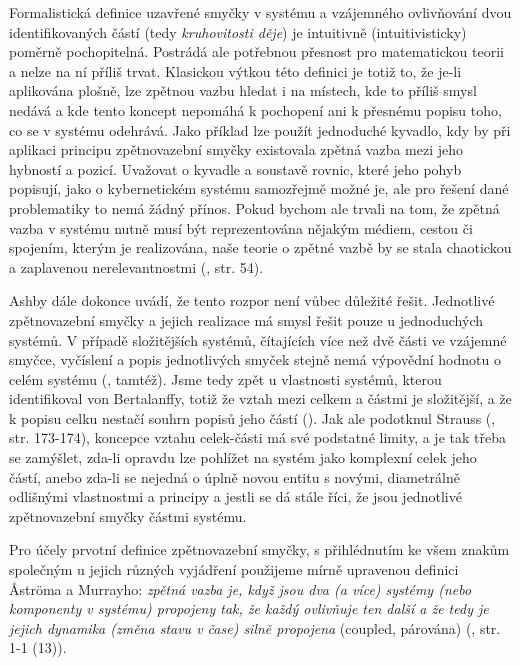 \documentclass[11pt,a4paper]{article}
\begin{document}
Formalistická definice uzavřené smyčky v systému a vzájemného ovlivňování dvou identifikovaných částí (tedy \textit{kruhovitosti děje}) je intuitivně (intuitivisticky) poměrně pochopitelná. Postrádá ale potřebnou přesnost pro matematickou teorii a nelze na ní příliš trvat. Klasickou výtkou této definici je totiž to, že je-li aplikována plošně, lze zpětnou vazbu hledat i na místech, kde to příliš smysl nedává a kde tento koncept nepomáhá k pochopení ani k přesnému popisu toho, co se v systému odehrává. Jako příklad lze použít jednoduché kyvadlo, kdy by při aplikaci principu zpětnovazební smyčky existovala zpětná vazba mezi jeho hybností a pozicí. Uvažovat o kyvadle a soustavě rovnic, které jeho pohyb popisují, jako o kybernetickém systému samozřejmě možné je, ale pro řešení dané problematiky to nemá žádný přínos. Pokud bychom ale trvali na tom, že zpětná vazba v systému nutně musí být reprezentována nějakým médiem, cestou či spojením, kterým je realizována, naše teorie o zpětné vazbě by se stala chaotickou a zaplavenou nerelevantnostmi (\cite{ashby_introduction_2015}, str. 54). 

Ashby dále dokonce uvádí, že tento rozpor není vůbec důležité řešit. Jednotlivé zpětnovazební smyčky a jejich realizace má smysl řešit pouze u jednoduchých systémů. V případě složitějších systémů, čítajících více než dvě části ve vzájemné smyčce, vyčíslení a popis jednotlivých smyček stejně nemá výpovědní hodnotu o celém systému (\cite*{ashby_introduction_2015}, tamtéž). Jsme tedy zpět u vlastnosti systémů, kterou identifikoval von Bertalanffy, totiž že vztah mezi celkem a částmi je složitější, a že k popisu celku nestačí souhrn popisů jeho částí (\cite*{von_bertalanffy_outline_1950}). Jak ale podotknul Strauss (\cite*{strauss_scope_2002}, str. 173-174), koncepce vztahu celek-části má své podstatné limity, a je tak třeba se zamýšlet, zda-li opravdu lze pohlížet na systém jako komplexní celek jeho částí, anebo zda-li se nejedná o úplně novou entitu s novými, diametrálně odlišnými vlastnostmi a principy a jestli se dá stále říci, že jsou jednotlivé zpětnovazební smyčky částmi systému.

Pro účely prvotní definice zpětnovazební smyčky, s přihlédnutím ke všem znakům společným u jejich různých vyjádření použijeme mírně upravenou definici Åströma a Murrayho: \textit{zpětná vazba je, když jsou dva (a více) systémy (nebo komponenty v systému) propojeny tak, že každý ovlivňuje ten další a že tedy je jejich dynamika (změna stavu v čase) silně propojena} (coupled, párována) (\cite*{astrom_feedback_2021}, str. 1-1 (13)).
\end{document}
